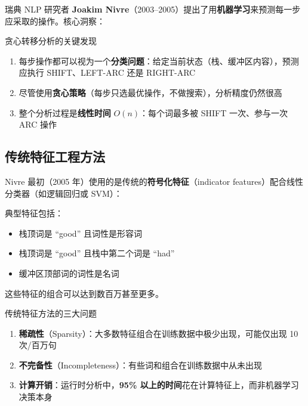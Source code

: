 \documentclass[a4paper]{article}
\begin{document}



瑞典 NLP 研究者 \textbf{Joakim Nivre}（2003--2005）提出了用\textbf{机器学习}来预测每一步应采取的操作。核心洞察：

\begin{importantbox}{贪心转移分析的关键发现}
\begin{enumerate}
    \item 每步操作都可以视为一个\textbf{分类问题}：给定当前状态（栈、缓冲区内容），预测应执行 SHIFT、LEFT-ARC 还是 RIGHT-ARC
    \item 尽管使用\textbf{贪心策略}（每步只选最优操作，不做搜索），分析精度仍然很高
    \item 整个分析过程是\textbf{线性时间} $O(n)$：每个词最多被 SHIFT 一次、参与一次 ARC 操作
\end{enumerate}
\end{importantbox}

\subsection{传统特征工程方法}

Nivre 最初（2005 年）使用的是传统的\textbf{符号化特征}（indicator features）配合线性分类器（如逻辑回归或 SVM）：





典型特征包括：
\begin{itemize}
    \item 栈顶词是 ``good'' 且词性是形容词
    \item 栈顶词是 ``good'' 且栈中第二个词是 ``had''
    \item 缓冲区顶部词的词性是名词
\end{itemize}

这些特征的组合可以达到数百万甚至更多。

\begin{warningbox}{传统特征方法的三大问题}
\begin{enumerate}
    \item \textbf{稀疏性}（Sparsity）：大多数特征组合在训练数据中极少出现，可能仅出现 10 次/百万句
    \item \textbf{不完备性}（Incompleteness）：有些词和组合在训练数据中从未出现
    \item \textbf{计算开销}：运行时分析中，\textbf{95\% 以上的时间}花在计算特征上，而非机器学习决策本身
\end{enumerate}
\end{warningbox}
\end{document}
